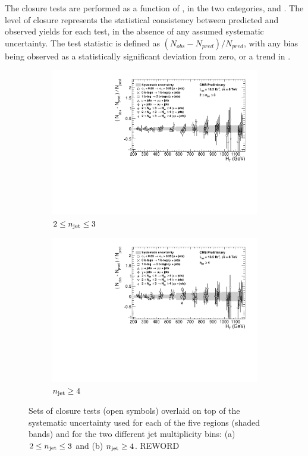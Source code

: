The closure tests are performed as a function of \HT, in the two \nj categories,
\njlow and \njhigh. The level of closure represents the statistical 
consistency between predicted and observed yields for each test, in the absence 
of any assumed systematic uncertainty. The test statistic is defined as $(N_{obs}
- N_{pred}) / N_{pred}$, with any bias being observed as a statistically 
significant deviation from zero, or a trend in \HT.

\begin{figure}[ht!]
  \centering
  \begin{subfigure}[b]{0.7\textwidth}
    \includegraphics[width=\textwidth]{Figs/syst/v0/le3j/summary_plot}
    \caption{$2 \leq n_{\text{jet}} \leq 3$}
    \label{fig:closure_summary_le3j}
  \end{subfigure}             
  \begin{subfigure}[b]{0.7\textwidth}
    \includegraphics[width=\textwidth]{Figs/syst/v0/ge4j/summary_plot}
    \caption{$n_{\text{jet}} \geq 4$}
    \label{fig:closure_summary_ge4j}
  \end{subfigure}             
  \caption{Sets of closure tests (open symbols) overlaid on top of
      the systematic uncertainty used for each of the five \HT
      regions (shaded bands) and for the two different jet
      multiplicity bins: (a) $2 \leq n_{\text{jet}} \leq 3$ and (b) $n_{\text{jet}} \geq
      4$. REWORD}
  \label{fig:closure_summary}
\end{figure}

